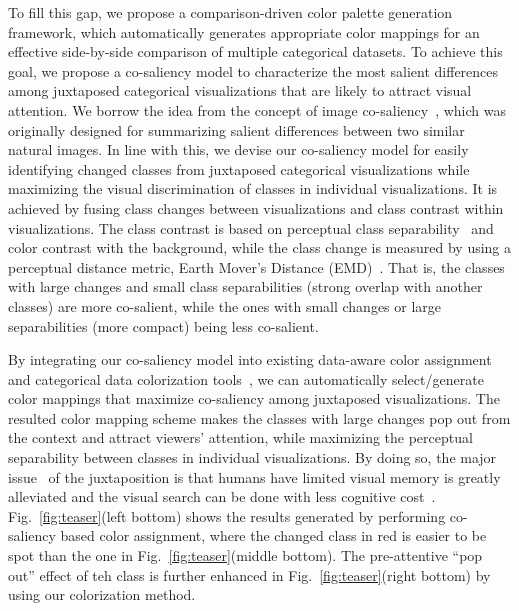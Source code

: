 To fill this gap, we propose a comparison-driven color palette generation framework, which automatically generates appropriate color mappings for an effective side-by-side comparison of multiple categorical datasets. To achieve this goal, we propose a co-saliency model to characterize the most salient differences among juxtaposed categorical visualizations that are likely to attract visual attention. We borrow the idea from the concept of image co-saliency~\cite{Jacobs10}, which was originally designed for summarizing salient differences between two similar natural images. %
In line with this, we devise our co-saliency model for easily identifying changed classes from juxtaposed categorical visualizations while maximizing the visual discrimination of classes in individual visualizations. It is achieved by fusing class changes between visualizations and class contrast within visualizations. The class contrast is based on perceptual class separability~\cite{Wang2018} and color contrast with the background, while
the class change is measured by using a perceptual distance metric,  Earth Mover's Distance (EMD)~\cite{rubner2000earth}.
That is, the classes with large changes and small class separabilities (strong overlap with another classes) are more co-salient, while the ones with small changes or large separabilities (more compact) being less co-salient.

By integrating our co-saliency model into existing data-aware color assignment and categorical data colorization tools~\cite{Wang2018, Lu21}, we can automatically select/generate color mappings that maximize co-saliency among juxtaposed visualizations. The resulted color mapping scheme makes the classes with large changes pop out from the context and attract viewers' attention,  while maximizing the perceptual separability between classes in individual visualizations. By doing so,
the major issue~\cite{Tominski12} of the juxtaposition is that humans have limited visual memory is greatly alleviated and the visual search can be done with less cognitive cost~\cite{healey1995visualizing}. Fig.~\ref{fig:teaser}(left bottom) shows the results generated by performing co-saliency based color assignment, where the changed class in red is easier to be spot than the one in Fig.~\ref{fig:teaser}(middle bottom). The pre-attentive ``pop out'' effect of teh class is further enhanced in Fig.~\ref{fig:teaser}(right bottom) by using our colorization method.


